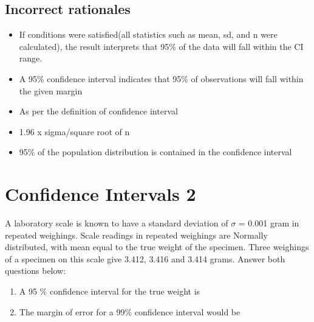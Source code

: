 \documentclass[letterpaper,12pt,twoside,printwatermark=false]{pinp}
\providecommand{\tightlist}{%
  \setlength{\itemsep}{0pt}\setlength{\parskip}{0pt}}
\begin{document}
\hypertarget{incorrect-rationales-2}{%
\subsection{Incorrect rationales}\label{incorrect-rationales-2}}

\begin{itemize}
\tightlist
\item
  If conditions were satisfied(all statistics such as mean, sd, and n
  were calculated), the result interprets that 95\% of the data will
  fall within the CI range.
\item
  A 95\% confidence interval indicates that 95\% of observations will
  fall within the given margin
\item
  As per the definition of confidence interval
\item
  1.96 x sigma/square root of n
\item
  95\% of the population distribution is contained in the confidence
  interval
\end{itemize}

\hypertarget{confidence-intervals-2}{%
\section{Confidence Intervals 2}\label{confidence-intervals-2}}

A laboratory scale is known to have a standard deviation of \(\sigma\) =
0.001 gram in repeated weighings. Scale readings in repeated weighings
are Normally distributed, with mean equal to the true weight of the
specimen. Three weighings of a specimen on this scale give 3.412, 3.416
and 3.414 grams. Answer both questions below:

\begin{enumerate}
\def\labelenumi{\roman{enumi})}
\tightlist
\item
  A 95 \% confidence interval for the true weight is
\item
  The margin of error for a 99\% confidence interval would be
\end{enumerate}
\end{document}
